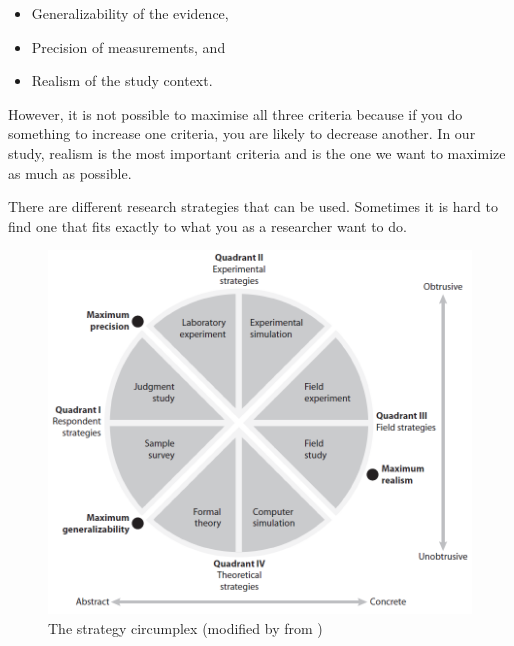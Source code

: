 \begin{itemize}
\item Generalizability of the evidence,
\item Precision of measurements, and 
\item Realism of the study context.  
\end{itemize}

However, it is not possible to maximise all three criteria because if you do something to increase one criteria, you are likely to decrease another. In our study, realism is the most important criteria and is the one we want to maximize as much as possible.

There are different research strategies that can be used. Sometimes it is hard to find one that fits exactly to what you as a researcher want to do.
\begin{figure}
\begin{center}
\includegraphics[scale=0.5]{circumplex}
\caption[The strategy circumplex]{The strategy circumplex (modified by \cite{alsos} from \cite{McGrath})}
\label{fig:circumplex}
\end{center}
\end{figure} 
